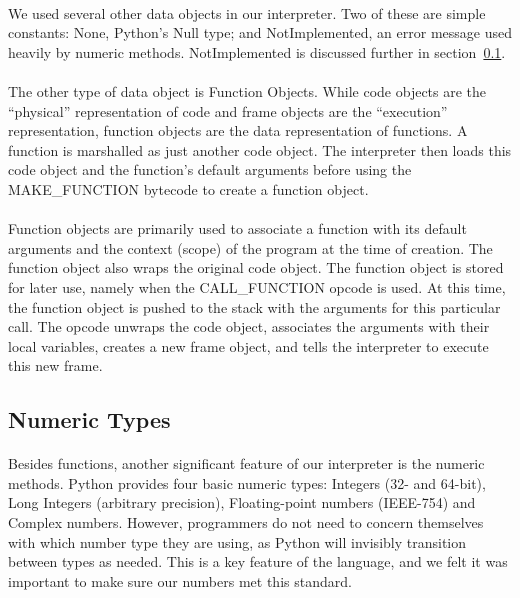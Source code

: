 \documentclass{article}
\begin{document}
\paragraph{}
We used several other data objects in our interpreter. Two of these are simple constants: None, Python's Null type; and NotImplemented, an error message used heavily by numeric methods. NotImplemented is discussed further in section~\ref{numeric}.

\paragraph{}
The other type of data object is Function Objects. While code objects are the ``physical'' representation of code and frame objects are the ``execution'' representation, function objects are the data representation of functions. A function is marshalled as just another code object. The interpreter then loads this code object and the function's default arguments before using the MAKE\_FUNCTION bytecode to create a function object.

\paragraph{}
Function objects are primarily used to associate a function with its default arguments and the context (scope) of the program at the time of creation. The function object also wraps the original code object. The function object is stored for later use, namely when the CALL\_FUNCTION opcode is used. At this time, the function object is pushed to the stack with the arguments for this particular call. The opcode unwraps the code object, associates the arguments with their local variables, creates a new frame object, and tells the interpreter to execute this new frame.

\subsection{Numeric Types} \label{numeric}

\paragraph{}
Besides functions, another significant feature of our interpreter is the numeric methods. Python provides four basic numeric types: Integers (32- and 64-bit), Long Integers (arbitrary precision), Floating-point numbers (IEEE-754) and Complex numbers. However, programmers do not need to concern themselves with which number type they are using, as Python will invisibly transition between types as needed. This is a key feature of the language, and we felt it was important to make sure our numbers met this standard.
\end{document}
